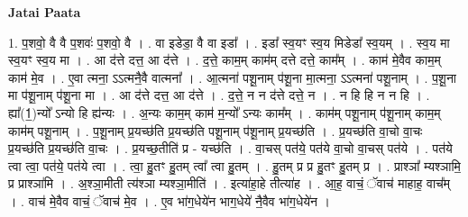 \documentclass[17pt]{extarticle}
\begin{document}
\textbf{Jatai Paata} \newline

1. प॒शवो॒ वै वै प॒शवः॑ प॒शवो॒ वै । . वा इडेडा॒ वै वा इडा᳚ । . इडा᳚ स्व॒यꣳ स्व॒य मिडेडा᳚ स्व॒यम् । . स्व॒य मा स्व॒यꣳ स्व॒य मा । . आ द॑त्ते दत्त॒ आ द॑त्ते । . द॒त्ते॒ काम॒म् काम॑म् दत्ते दत्ते॒ काम᳚म् । . काम॑ मे॒वैव काम॒म् काम॑ मे॒व । . ए॒वा त्मना॒ ऽऽत्मनै॒वै वात्मना᳚ । . आ॒त्मना॑ पशू॒नाम् प॑शू॒ना मा॒त्मना॒ ऽऽत्मना॑ पशू॒नाम् । . प॒शू॒ना मा प॑शू॒नाम् प॑शू॒ना मा । . आ द॑त्ते दत्त॒ आ द॑त्ते । . द॒त्ते॒ न न द॑त्ते दत्ते॒ न । . न हि हि न न हि । . ह्या᳚(1॒)न्यो᳚ ऽन्यो हि ह्य॑न्यः । . अ॒न्यः काम॒म् काम॑ म॒न्यो᳚ ऽन्यः काम᳚म् । . काम॑म् पशू॒नाम् प॑शू॒नाम् काम॒म् काम॑म् पशू॒नाम् । . प॒शू॒नाम् प्र॒यच्छ॑ति प्र॒यच्छ॑ति पशू॒नाम् प॑शू॒नाम् प्र॒यच्छ॑ति । . प्र॒यच्छ॑ति वा॒चो वा॒चः प्र॒यच्छ॑ति प्र॒यच्छ॑ति वा॒चः । . प्र॒यच्छ॒तीति॑ प्र - यच्छ॑ति । . वा॒चस् पत॑ये॒ पत॑ये वा॒चो वा॒चस् पत॑ये । . पत॑ये त्वा त्वा॒ पत॑ये॒ पत॑ये त्वा । . त्वा॒ हु॒तꣳ हु॒तम् त्वा᳚ त्वा हु॒तम् । . हु॒तम् प्र प्र हु॒तꣳ हु॒तम् प्र । . प्राश्ञा᳚ म्यश्ञामि॒ प्र प्राश्ञा॑मि । . अ॒श्ञा॒मीती त्य॑श्ञा म्यश्ञा॒मीति॑ । . इत्या॑हा॒हे तीत्या॑ह । . आ॒ह॒ वाचं॒ ॅवाच॑ माहाह॒ वाच᳚म् । . वाच॑ मे॒वैव वाचं॒ ॅवाच॑ मे॒व । . ए॒व भा॑ग॒धेये॑न भाग॒धेये॑ नै॒वैव भा॑ग॒धेये॑न । \newline
\end{document}
